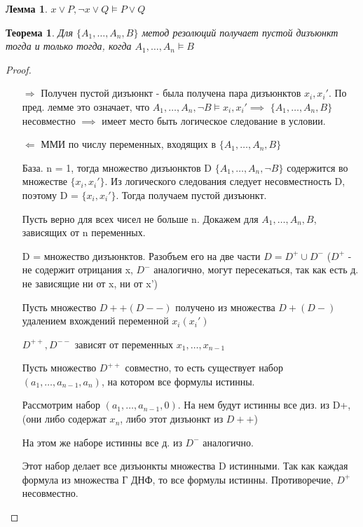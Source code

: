 \documentclass[a4paper]{article}
\newtheorem{theorem}{Теорема}[section]
\newtheorem{lemma}{Лемма}[section]
\theoremstyle{definition}
\theoremstyle{remark}
\begin{document}
    \begin{lemma}
        $x \vee P, \neg x\vee Q\models P\vee Q$
    \end{lemma}
    \begin{theorem}
        Для $\{A_1, \dots, A_n, B\}$ метод резолюций получает пустой дизъюнкт тогда и только тогда,
        когда $A_1, \dots, A_n\models B$
    \end{theorem}
    \begin{proof}
        \begin{itemize}
            \item[$\Rightarrow$] Получен пустой дизъюнкт - была получена пара дизъюнктов $x_i, x_i'$.
            По пред. лемме это означает, что $A_1, \dots, A_n, \neg B\models x_i, x_i'\implies$
            $\{A_1, \dots, A_n, B\}$ несовместно $\implies$ имеет место быть логическое следование в условии.
            \item[$\Leftarrow$]
            ММИ по числу переменных, входящих в $\{A_1, \dots, A_n, B\}$

            База. n = 1, тогда множество дизъюнктов D $\{A_1, \dots, A_n, \neg B\}$
            содержится во множестве $\{x_i, x_i '\}$. Из логического следования следует несовместность D, поэтому
            D = $\{x_i, x_i '\}$. Тогда получаем пустой дизъюнкт.

            Пусть верно для всех чисел не больше n. Докажем для $A_1, \dots, A_n, B$, зависящих от n переменных.

            D =  множество дизъюнктов. Разобъем его на две части $D = D^+\cup D^-$
            ($D^+$ - не содержит отрицания x, $D^-$ аналогично, могут пересекаться, так как есть д. не зависящие ни от x, ни от x')

            Пусть множество $D++(D--)$ получено из множества $D+(D-)$ удалением вхождений переменной $x_i (x_i')$

            $D^{++}, D^{--}$ зависят от переменных $x_1, \dots, x_{n-1}$
            
            Пусть множество $D^{++}$ совместно, то есть существует набор$(a_1, \dots, a_{n-1}, a_n)$, на котором все формулы истинны.
            
            Рассмотрим набор $(a_1, \dots, a_{n-1}, 0)$. На нем будут истинны все диз. из D+,
            (они либо содержат $x_n$, либо этот дизъюнкт из $D++$)

            На этом же наборе истинны все д. из $D^-$ аналогично.

            Этот набор делает все дизъюнкты множества D истинными. Так как каждая формула из множества Г ДНФ, то
            все формулы истинны. Противоречие, $D^+$ несовместно.


\end{itemize}
\end{proof}
\end{document}
